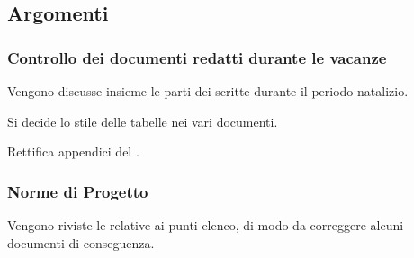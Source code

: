         \subsection{Argomenti}
            \subsubsection{Controllo dei documenti redatti durante le vacanze}
            Vengono discusse insieme le parti dei  scritte durante il periodo natalizio.\par
            Si decide lo stile delle tabelle nei vari documenti.\par
            Rettifica appendici del \PdQd.
            
            \subsubsection{Norme di Progetto}
            Vengono riviste le  relative ai punti elenco, di modo da correggere alcuni documenti di conseguenza.
            

